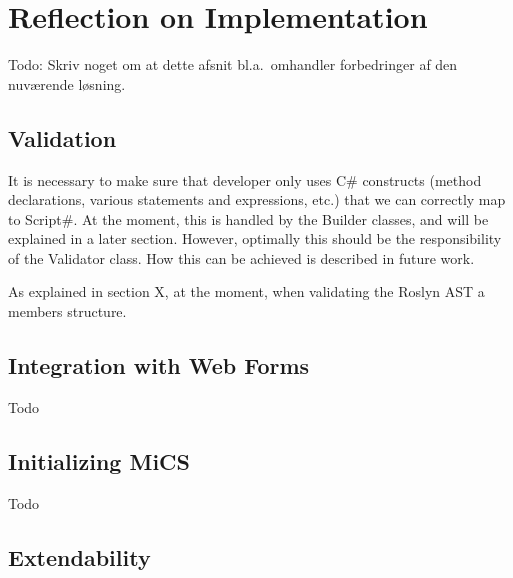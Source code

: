 \section{Reflection on Implementation} %
\label{sec:reflection_on_implementation}
Todo: Skriv noget om at dette afsnit bl.a.\ omhandler forbedringer af den nuværende løsning.

\subsection{Validation} %
\label{ssub:validation}
It is necessary to make sure that developer only uses C\# constructs (method declarations, various statements and expressions, etc.) that we can correctly map to Script\#. At the moment, this is handled by the Builder classes, and will be explained in a later section. However, optimally this should be the responsibility of the Validator class. How this can be achieved is described in future work.

As explained in section X, at the moment, when validating the Roslyn AST a members structure.

\subsection{Integration with Web Forms} %
\label{ssub:integration_with_web_forms}
Todo

\subsection{Initializing MiCS} %
\label{ssub:collecting_source_code}
Todo

\subsection{Extendability} %
\label{sub:extendability}


